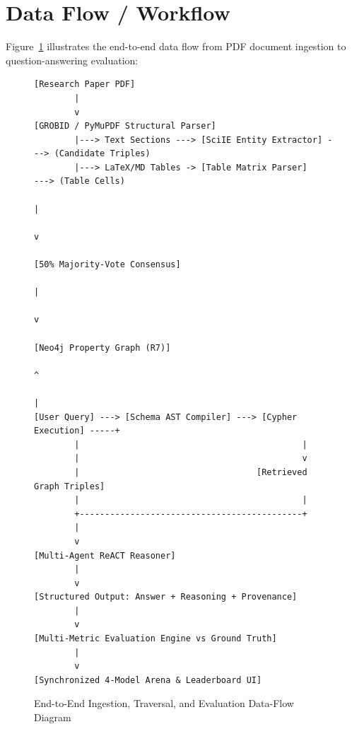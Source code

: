 \section{Data Flow / Workflow}
Figure~\ref{fig:workflow_diagram} illustrates the end-to-end data flow from PDF document ingestion to question-answering evaluation:
\begin{figure}[h]
\centering
\begin{verbatim}
[Research Paper PDF]
        |
        v
[GROBID / PyMuPDF Structural Parser] 
        |---> Text Sections ---> [SciIE Entity Extractor] ---> (Candidate Triples)
        |---> LaTeX/MD Tables -> [Table Matrix Parser]     ---> (Table Cells)
                                                                     |
                                                                     v
                                                          [50% Majority-Vote Consensus]
                                                                     |
                                                                     v
                                                          [Neo4j Property Graph (R7)]
                                                                     ^
                                                                     |
[User Query] ---> [Schema AST Compiler] ---> [Cypher Execution] -----+
        |                                            |
        |                                            v
        |                                   [Retrieved Graph Triples]
        |                                            |
        +--------------------------------------------+
        |
        v
[Multi-Agent ReACT Reasoner]
        |
        v
[Structured Output: Answer + Reasoning + Provenance]
        |
        v
[Multi-Metric Evaluation Engine vs Ground Truth]
        |
        v
[Synchronized 4-Model Arena & Leaderboard UI]
\end{verbatim}
\caption{End-to-End Ingestion, Traversal, and Evaluation Data-Flow Diagram}
\label{fig:workflow_diagram}
\end{figure}
